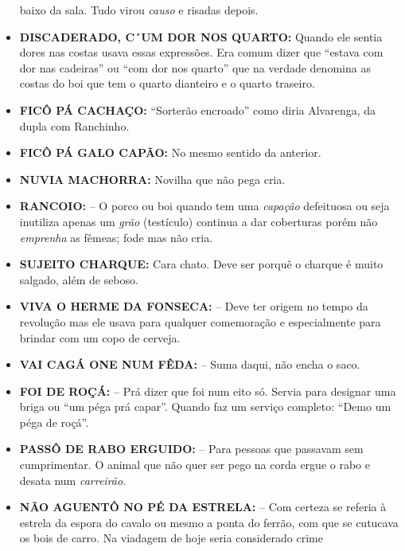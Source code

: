 \documentclass[12pt,brazil,]{book}
\begin{document}
\begin{itemize}
  baixo da sala. Tudo virou \emph{causo} e risadas depois.\\
\item
  \textbf{DISCADERADO, C´UM DOR NOS QUARTO:} Quando ele sentia dores nas
  costas usava essas expressões. Era comum dizer que ``estava com dor
  nas cadeiras'' ou ``com dor nos quarto'' que na verdade denomina as
  costas do boi que tem o quarto dianteiro e o quarto traseiro.\\
\item
  \textbf{FICÔ PÁ CACHAÇO:} ``Sorterão encroado'' como diria Alvarenga,
  da dupla com Ranchinho.\\
\item
  \textbf{FICÔ PÁ GALO CAPÃO:} No mesmo sentido da anterior.\\
\item
  \textbf{NUVIA MACHORRA:} Novilha que não pega cria.\\
\item
  \textbf{RANCOIO:} -- O porco ou boi quando tem uma \emph{capação}
  defeituosa ou seja inutiliza apenas um \emph{grão} (testículo)
  continua a dar coberturas porém não \emph{emprenha} as fêmeas; fode
  mas não cria.\\
\item
  \textbf{SUJEITO CHARQUE:} Cara chato. Deve ser porquê o charque é
  muito salgado, além de seboso.\\
\item
  \textbf{VIVA O HERME DA FONSECA:} -- Deve ter origem no tempo da
  revolução mas ele usava para qualquer comemoração e especialmente para
  brindar com um copo de cerveja.\\
\item
  \textbf{VAI CAGÁ ONE NUM FÊDA:} -- Suma daqui, não encha o saco.\\
\item
  \textbf{FOI DE ROÇÁ:} -- Prá dizer que foi num eito só. Servia para
  designar uma briga ou ``um péga prá capar''. Quando faz um serviço
  completo: ``Demo um péga de roçá''.\\
\item
  \textbf{PASSÔ DE RABO ERGUIDO:} -- Para pessoas que passavam sem
  cumprimentar. O animal que não quer ser pego na corda ergue o rabo e
  desata num \emph{carreirão}.\\
\item
  \textbf{NÃO AGUENTÔ NO PÉ DA ESTRELA:} -- Com certeza se referia à
  estrela da espora do cavalo ou mesmo a ponta do ferrão, com que se
  cutucava os bois de carro. Na viadagem de hoje seria considerado crime

\end{itemize}
\end{document}
